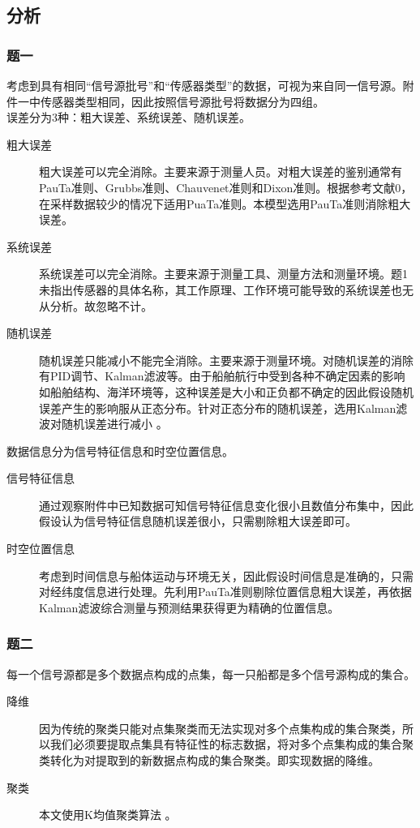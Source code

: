 \subsection{分析}
\subsubsection{题一}
考虑到具有相同“信号源批号”和“传感器类型”的数据，可视为来自同一信号源。附件一中传感器类型相同，因此按照信号源批号将数据分为四组。
\\\indent 误差分为3种：粗大误差、系统误差、随机误差。
\begin{description}
	\item[粗大误差]粗大误差可以完全消除。主要来源于测量人员。对粗大误差的鉴别通常有PauTa准则、Grubbs准则、Chauvenet准则和Dixon准则。根据参考文献0，在采样数据较少的情况下适用PuaTa准则。本模型选用PauTa准则消除粗大误差。
	\item[系统误差]系统误差可以完全消除。主要来源于测量工具、测量方法和测量环境。题1未指出传感器的具体名称，其工作原理、工作环境可能导致的系统误差也无从分析。故忽略不计。
	\item[随机误差]随机误差只能减小不能完全消除。主要来源于测量环境。对随机误差的消除有PID调节、Kalman滤波等。由于船舶航行中受到各种不确定因素的影响如船舶结构、海洋环境等，这种误差是大小和正负都不确定的因此假设随机误差产生的影响服从正态分布。针对正态分布的随机误差，选用Kalman滤波对随机误差进行减小\cite{Kalman} 。
\end{description}
\par 数据信息分为信号特征信息和时空位置信息。
\begin{description}
	\item[信号特征信息]通过观察附件中已知数据可知信号特征信息变化很小且数值分布集中，因此假设认为信号特征信息随机误差很小，只需剔除粗大误差即可。
	\item[时空位置信息]考虑到时间信息与船体运动与环境无关，因此假设时间信息是准确的，只需对经纬度信息进行处理。先利用PauTa准则剔除位置信息粗大误差，再依据Kalman滤波综合测量与预测结果获得更为精确的位置信息。
\end{description}
\subsubsection{题二}
每一个信号源都是多个数据点构成的点集，每一只船都是多个信号源构成的集合。
\begin{description}
	\item[降维]因为传统的聚类只能对点集聚类而无法实现对多个点集构成的集合聚类，所以我们必须要提取点集具有特征性的标志数据，将对多个点集构成的集合聚类转化为对提取到的新数据点构成的集合聚类。即实现数据的降维。
	\item[聚类]本文使用K均值聚类算法\cite{clustering} 。
\end{description}
